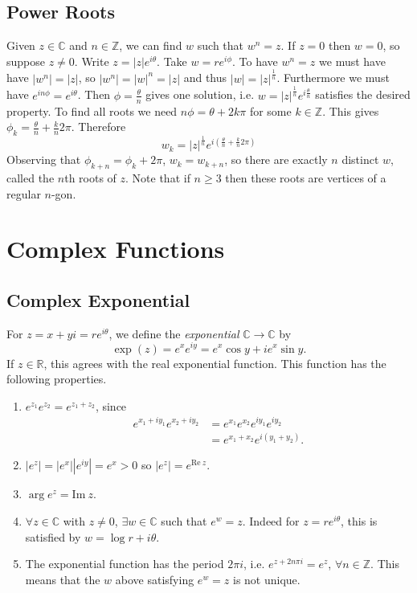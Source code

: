 \subsection{Power Roots}
Given $z \in \mathbb{C}$ and $n \in \mathbb{Z}$, we can find $w$
such that $w^n = z$. If $z = 0$ then $w = 0$, so suppose $z \neq 0$.
Write $z = |z| e^{i \theta}$. Take $w = r e^{i \phi}$. To have
$w^n = z$ we must have have $|w^n| = |z|$, so
$|w^n| = |w|^n = |z|$ and thus $|w| = |z|^{\frac{1}{n}}$. Furthermore
we must have $e^{i n \phi} = e^{i \theta}$. Then $\phi = \frac{\theta}{n}$
gives one solution, i.e. $w = |z|^{\frac{1}{n}} e^{i \frac{\theta}{n}}$
satisfies the desired property. To find all roots we need
$n \phi = \theta + 2 k \pi$ for some $k \in \mathbb{Z}$. This gives
$\phi_k = \frac{\theta}{n} + \frac{k}{n} 2\pi$. Therefore
$$
w_k = |z|^{\frac{1}{n}} e^{i\left(\frac{\theta}{n} + \frac{k}{n} 2\pi\right)}
$$
Observing that $\phi_{k + n} = \phi_k + 2\pi$, $w_k = w_{k+n}$, so there
are exactly $n$ distinct $w$, called the $n$th roots of $z$. Note that
if $n \geq 3$ then these roots are vertices of a regular $n$-gon.

\section{Complex Functions}

\subsection{Complex Exponential}
For $z = x + yi = r e^{i\theta}$, we define the \emph{exponential}
$\mathbb{C} \to \mathbb{C}$ by
$$
\exp(z) = e^x e^{iy} = e^x \cos y + i e^x \sin y.
$$
If $z \in \mathbb{R}$, this agrees with the real exponential function.
This function has the following properties.
\begin{enumerate}
  \item{
    $e^{z_1} e^{z_2} = e^{z_1 + z_2}$, since
    \begin{align*}
       e^{x_1 + i y_1} e^{x_2 + i y_2}
    &= e^{x_1} e^{x_2} e^{i y_1} e^{i y_2} \\
    &= e^{x_1 + x_2} e^{i(y_1 + y_2)}.
    \end{align*}
  }
  \item{
    $|e^z| = |e^x||e^{iy}| = e^x > 0$ so
    $|e^z| = e^{\mathrm{Re}~z}$.
  }
  \item{
    $\arg e^{z} = \mathrm{Im}~z$.
  }
  \item{
    $\forall z \in \mathbb{C}$ with
    $z \neq 0$, $\exists w \in \mathbb{C}$ such that
    $e^w = z$. Indeed for $z = r e^{i \theta}$,
    this is satisfied by $w = \log r + i \theta$.
  }
  \item{
    The exponential function has the period $2 \pi i$,
    i.e. $e^{z + 2 n \pi i} = e^z$, $\forall n \in \mathbb{Z}$.
    This means that the $w$ above satisfying $e^w = z$ is not unique.
  }
\end{enumerate}

